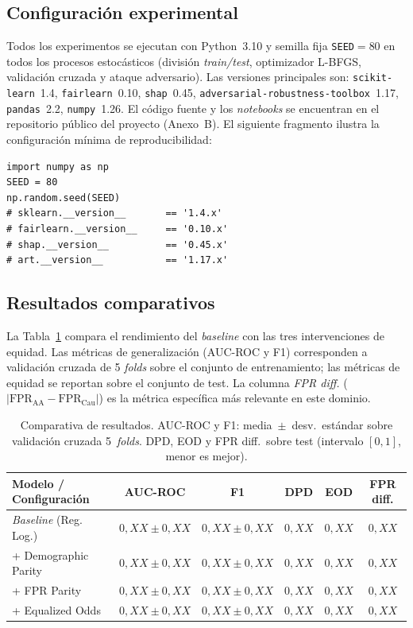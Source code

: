 \documentclass[11pt,a4paper]{article}
\begin{document}
\subsection{Configuración experimental}

Todos los experimentos se ejecutan con Python~3.10 y semilla fija \texttt{SEED}$=80$ en todos los procesos estocásticos (división \textit{train/test}, optimizador L-BFGS, validación cruzada y ataque adversario). Las versiones principales son: \texttt{scikit-learn}~1.4, \texttt{fairlearn}~0.10, \texttt{shap}~0.45, \texttt{adversarial-robustness-toolbox}~1.17, \texttt{pandas}~2.2, \texttt{numpy}~1.26. El código fuente y los \textit{notebooks} se encuentran en el repositorio público del proyecto (Anexo~B). El siguiente fragmento ilustra la configuración mínima de reproducibilidad:

\begin{lstlisting}[caption={Semilla aleatoria y entorno principal.}]
import numpy as np
SEED = 80
np.random.seed(SEED)
# sklearn.__version__       == '1.4.x'
# fairlearn.__version__     == '0.10.x'
# shap.__version__          == '0.45.x'
# art.__version__           == '1.17.x'
\end{lstlisting}

\subsection{Resultados comparativos}

La Tabla~\ref{tab:resultados} compara el rendimiento del \textit{baseline} con las tres intervenciones de equidad. Las métricas de generalización (AUC-ROC y F1) corresponden a validación cruzada de 5 \textit{folds} sobre el conjunto de entrenamiento; las métricas de equidad se reportan sobre el conjunto de test. La columna \textit{FPR diff.} ($|\text{FPR}_{\text{AA}}-\text{FPR}_{\text{Cau}}|$) es la métrica específica más relevante en este dominio.

\begin{table}[H]
\centering
\caption{Comparativa de resultados. AUC-ROC y F1: media~$\pm$~desv.\ estándar sobre validación cruzada 5~\textit{folds}. DPD, EOD y FPR diff.\ sobre test (intervalo $[0,1]$, menor es mejor).}
\label{tab:resultados}
\small
\begin{tabular}{@{}lccccc@{}}
\toprule
\textbf{Modelo / Configuración} & \textbf{AUC-ROC} & \textbf{F1} & \textbf{DPD} & \textbf{EOD} & \textbf{FPR diff.}\\
\midrule
\textit{Baseline} (Reg. Log.)   & $0{,}XX \pm 0{,}XX$ & $0{,}XX \pm 0{,}XX$ & $0{,}XX$ & $0{,}XX$ & $0{,}XX$ \\
+ Demographic Parity            & $0{,}XX \pm 0{,}XX$ & $0{,}XX \pm 0{,}XX$ & $0{,}XX$ & $0{,}XX$ & $0{,}XX$ \\
+ FPR Parity                    & $0{,}XX \pm 0{,}XX$ & $0{,}XX \pm 0{,}XX$ & $0{,}XX$ & $0{,}XX$ & $0{,}XX$ \\
+ Equalized Odds                & $0{,}XX \pm 0{,}XX$ & $0{,}XX \pm 0{,}XX$ & $0{,}XX$ & $0{,}XX$ & $0{,}XX$ \\
\bottomrule
\end{tabular}
\end{table}
\end{document}
